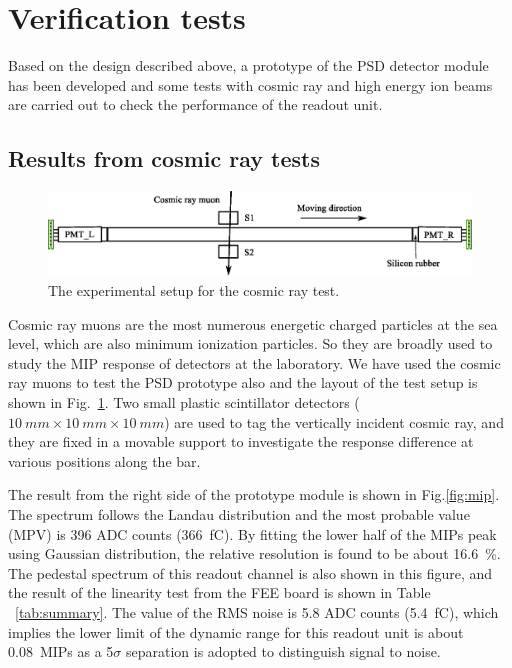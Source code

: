 \documentclass[preprint, times]{elsarticle}
\begin{document}
\section{Verification tests}
\label{sec:result}
Based on the design described above, a prototype of the PSD detector module has been developed and some tests with cosmic ray and high energy ion beams are carried out to check the performance of the readout unit.

\subsection{Results from cosmic ray tests}
\label{sec:cosmicray}

\begin{figure}
 \centering
 \includegraphics[width=130mm]{cosmic_test}
\caption{The experimental setup for the cosmic ray test.}
\label{fig:cosmic_test}
\end{figure}

Cosmic ray muons are the most numerous energetic charged particles at the sea level, which are also minimum ionization particles. So they are broadly used to study the MIP response of detectors at the laboratory.
We have used the cosmic ray muons to test the PSD prototype also and the layout of the test setup is shown in Fig.~\ref{fig:cosmic_test}.
Two small plastic scintillator detectors ($\SI{10}{mm} \times \SI{10}{mm} \times \SI{10}{mm}$) are used to tag the vertically incident cosmic ray, and they are fixed in a movable support to investigate the response difference at various positions along the bar.

The result from the right side of the prototype module is shown in Fig.\ref{fig:mip}.
The spectrum follows the Landau distribution and the most probable value (MPV) is 396 ADC counts (\SI{366}{\femto\coulomb}).
By fitting the lower half of the MIPs peak using Gaussian distribution, the relative resolution is found to be about \SI{16.6}{\percent}.
The pedestal spectrum of this readout channel is also shown in this figure, and the result of the linearity test from the FEE board is shown in Table ~\ref{tab:summary}. The value of the RMS noise is 5.8 ADC counts (\SI{5.4}{\femto\coulomb}), which implies the lower limit of the dynamic range for this readout unit is about \SI{0.08}{MIPs} as a 5$\sigma$ separation is adopted to distinguish signal to noise.
\end{document}
